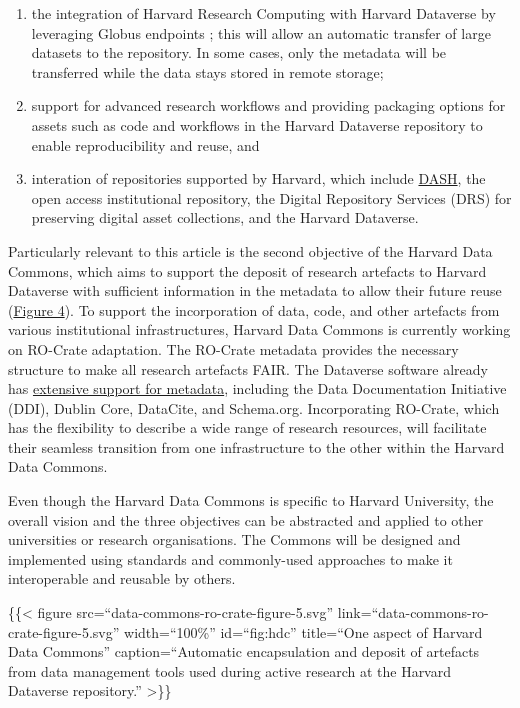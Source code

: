 {\begin{enumerate}
\def\labelenumi{\arabic{enumi}.}
\tightlist
\item
  the integration of Harvard Research Computing with Harvard Dataverse
  by leveraging Globus endpoints
  \cite{Chard 2014}; this will allow
  an automatic transfer of large datasets to the repository. In some
  cases, only the metadata will be transferred while the data stays
  stored in remote storage;
\item
  support for advanced research workflows and providing packaging
  options for assets such as code and workflows in the Harvard Dataverse
  repository to enable reproducibility and reuse, and
\item
  interation of repositories supported by Harvard, which include
  \href{https://dash.harvard.edu/}{DASH}, the open access institutional
  repository, the Digital Repository Services (DRS) for preserving
  digital asset collections, and the Harvard Dataverse.
\end{enumerate}

Particularly relevant to this article is the second objective of the
Harvard Data Commons, which aims to support the deposit of research
artefacts to Harvard Dataverse with sufficient information in the
metadata to allow their future reuse (\protect\hyperlink{fig:hdc}{Figure
4}). To support the incorporation of data, code, and other artefacts
from various institutional infrastructures, Harvard Data Commons is
currently working on RO-Crate adaptation. The RO-Crate metadata provides
the necessary structure to make all research artefacts FAIR. The
Dataverse software already has
\href{https://guides.dataverse.org/en/latest/user/appendix.html}{extensive
support for metadata}, including the Data Documentation Initiative
(DDI), Dublin Core, DataCite, and Schema.org. Incorporating RO-Crate,
which has the flexibility to describe a wide range of research
resources, will facilitate their seamless transition from one
infrastructure to the other within the Harvard Data Commons.

Even though the Harvard Data Commons is specific to Harvard University,
the overall vision and the three objectives can be abstracted and
applied to other universities or research organisations. The Commons
will be designed and implemented using standards and commonly-used
approaches to make it interoperable and reusable by others.

\{\{\textless{} figure src=``data-commons-ro-crate-figure-5.svg''
link=``data-commons-ro-crate-figure-5.svg'' width=``100\%''
id=``fig:hdc'' title=``One aspect of Harvard Data Commons''
caption=``Automatic encapsulation and deposit of artefacts from data
management tools used during active research at the Harvard Dataverse
repository.'' \textgreater\}\}

}
